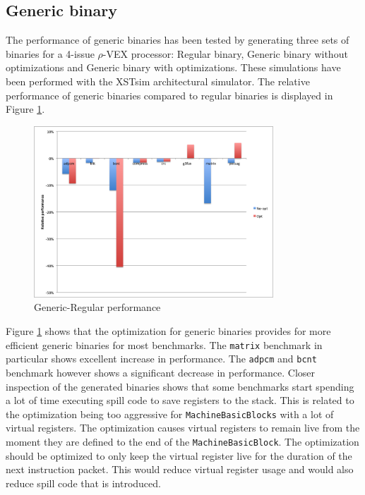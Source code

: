 \subsection{Generic binary}
The performance of generic binaries has been tested by generating three sets of binaries for a 4-issue $\rho$-VEX processor: Regular binary, Generic binary without optimizations and Generic binary with optimizations. These simulations have been performed with the XSTsim architectural simulator. The relative performance of generic binaries compared to regular binaries is displayed in Figure \ref{fig:rel_gen}.

\begin{figure}[ht]
\centering
\includegraphics[width=0.8\textwidth]{5_results/img/rel_gen.png}
\caption{Generic-Regular performance}
\label{fig:rel_gen}
\end{figure}

Figure \ref{fig:rel_gen} shows that the optimization for generic binaries provides for more efficient generic binaries for most benchmarks. The \texttt{matrix} benchmark in particular shows excellent increase in performance. The \texttt{adpcm} and \texttt{bcnt} benchmark however shows a significant decrease in performance. Closer inspection of the generated binaries shows that some benchmarks start spending a lot of time executing spill code to save registers to the stack. This is related to the optimization being too aggressive for \texttt{MachineBasicBlocks} with a lot of virtual registers. The optimization causes virtual registers to remain live from the moment they are defined to the end of the \texttt{MachineBasicBlock}. The optimization should be optimized to only keep the virtual register live for the duration of the next instruction packet. This would reduce virtual register usage and would also reduce spill code that is introduced.

